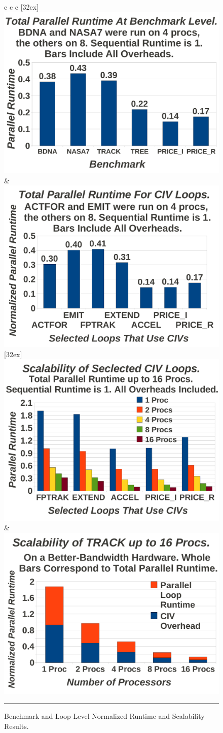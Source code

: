 \documentclass{sig-alternate}
\begin{document}
\begin{figure}[t]
	\begin{tabular}{c c c} 
	[32ex]
	{      		%
                \includegraphics[width=.35\textwidth]{Figures/EmpRes/BenchParRes} \vspace{2ex}     
	} & { \hspace{-55ex}
                    \includegraphics[width=.35\textwidth]{Figures/EmpRes/LoopParRes} \vspace{2ex}
	} \\ 
	[32ex]
	{           
                \includegraphics[width=.35\textwidth]{Figures/EmpRes/LoopScalRes}
	} & { \hspace{16ex}
                \includegraphics[width=.35\textwidth]{Figures/EmpRes/TrackScalNew}
	}
\end{tabular}
\hrule
\caption{ Benchmark and Loop-Level Normalized Runtime and Scalability Results. }
\label{fig:ParRuntime} %
\end{figure}
\end{document}
